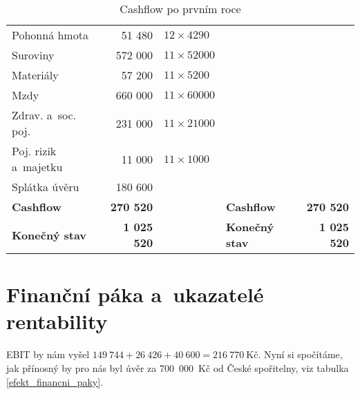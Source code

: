 \begin{table}[htbp]
\begin{center}
\begin{tabular}{ l r l l r }
\hspace{0,5cm}Pohonná hmota                & 51 480             & $12 \times 4290$  &                                                   &                    \\
\hspace{0,5cm}Suroviny                     & 572 000            & $11 \times 52000$ &                                                   &                    \\
\hspace{0,5cm}Materiály                    & 57 200             & $11 \times 5200$  &                                                   &                    \\
\hspace{0,5cm}Mzdy\index{mzda}                         & 660 000            & $11 \times 60000$ &                                                   &                    \\
\hspace{0,5cm}Zdrav. a~soc. poj.           & 231 000            & $11 \times 21000$ &                                                   &                    \\
\hspace{0,5cm}Poj. rizik a~majetku         & 11 000             & $11 \times 1000$  & \textbf{}                                         & \textbf{}          \\
\hspace{0,5cm}Splátka úvěru\index{úvěr}                & 180 600            &                   & \textbf{}                                         & \textbf{}          \\ \hline
\textbf{Cashflow\index{cashflow}}                          & \textbf{270 520}   &                   & \textbf{Cashflow\index{cashflow}}                                 & \textbf{270 520}   \\
\textbf{Konečný stav}                      & \textbf{1 025 520} &                   & \textbf{Konečný stav}                             & \textbf{1 025 520}
\end{tabular}
\caption{Cashflow po prvním roce}
\label{cashflow}
\end{center}
\end{table}


\section{Finanční páka a~ukazatelé rentability}
EBIT by nám vyšel $149~744 + 26~426 + 40~600 = 216~770~\text{Kč}$. Nyní si spočítáme, jak přínosný by pro nás byl úvěr za 700~000~Kč od České spořitelny, viz tabulka \ref{efekt_financni_paky}.


